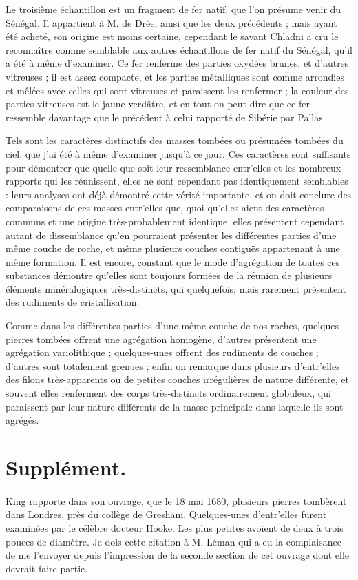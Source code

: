 \documentclass[a4paper, 12pt, oneside, french]{article}
\begin{document}
Le troisième échantillon est un fragment de fer natif, que l'on présume venir du Sénégal. Il appartient à M. de Drée, ainsi que les deux précédents ; mais ayant été acheté, son origine est moins certaine, cependant le savant Chladni a cru le reconnaître comme semblable aux autres échantillons de fer natif du Sénégal, qu'il a été à même d'examiner. Ce fer renferme des parties oxydées brunes, et d'autres vitreuses ; il est assez compacte, et les parties métalliques sont comme arrondies et mêlées avec celles qui sont vitreuses et paraissent les renfermer ; la couleur des parties vitreuses est le jaune verdâtre, et en tout on peut dire que ce fer ressemble davantage que le précédent à celui rapporté de Sibérie par Pallas.

Tels sont les caractères distinctifs des masses tombées ou présumées tombées du ciel, que j'ai été à même d'examiner jusqu'à ce jour. Ces caractères sont suffisants pour démontrer que quelle que soit leur ressemblance entr'elles et les nombreux rapports qui les réunissent, elles ne sont cependant pas identiquement semblables : leurs analyses ont déjà démontré cette vérité importante, et on doit conclure des comparaisons de ces masses entr'elles que, quoi qu’elles aient des caractères communs et une origine très-probablement identique, elles présentent cependant autant de dissemblance qu'en pourraient présenter les différentes parties d'une même couche de roche, et même plusieurs couches contiguës appartenant à une même formation. Il est encore, constant que le mode d'agrégation de toutes ces substances démontre qu'elles sont toujours formées de la réunion de plusieurs éléments minéralogiques très-distincts, qui quelquefois, mais rarement présentent des rudiments de cristallisation.

Comme dans les différentes parties d'une même couche de nos roches, quelques pierres tombées offrent une agrégation homogène, d'autres présentent une agrégation variolithique ; quelques-unes offrent des rudiments de couches ; d'autres sont totalement grenues ; enfin on remarque dans plusieurs d'entr'elles des filons très-apparents ou de petites couches irrégulières de nature différente, et souvent elles renferment des corps très-distincts ordinairement globuleux, qui paraissent par leur nature différents de la masse principale dans laquelle ils sont agrégés.
\clearpage
\section{Supplément.}
\paragraph{}
King rapporte dans son ouvrage, que le 18 mai 1680, plusieurs pierres tombèrent dans Londres, près du collège de Gresham. Quelques-unes d'entr'elles furent examinées par le célèbre docteur Hooke. Les plus petites avoient de deux à trois pouces de diamètre. Je dois cette citation à M. Léman qui a eu la complaisance de me l'envoyer depuis l'impression de la seconde section de cet ouvrage dont elle devrait faire partie.
\end{document}
